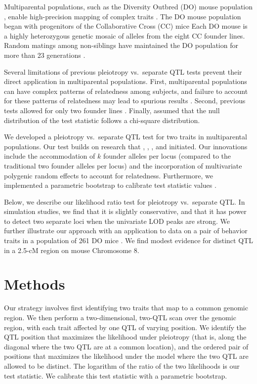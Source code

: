 \documentclass[oneside]{book}\usepackage[]{graphicx}\usepackage[]{color}
\begin{document}
Multiparental populations, such
as the Diversity Outbred (DO) mouse population \citep{churchill2012diversity}, enable high-precision
mapping of complex traits \citep{de2014genetics}. The DO
mouse population began with progenitors of the Collaborative
Cross (CC) mice \citep{churchill2004collaborative}
Each DO mouse is a highly heterozygous genetic mosaic
of alleles from the eight CC founder lines. Random
matings among non-siblings have maintained the DO
population for more than 23 generations \citep{chesler2016diversity}.

Several limitations of previous pleiotropy vs.\ separate QTL tests
prevent their direct application in multiparental populations. First,
multiparental populations can have complex patterns of relatedness
among subjects, and failure to account for these patterns of
relatedness may lead to spurious results \citep{yang2014advantages}.
Second, previous tests allowed for only two founder lines
\citep{jiang1995multiple}. Finally, \citet{jiang1995multiple} assumed
that the null distribution of the test statistic follows a chi-square
distribution.

We developed a pleiotropy vs.\ separate QTL test for two traits in
multiparental populations. Our test builds on research that
\citet{jiang1995multiple}, \citet{knott2000multitrait},
\citet{tian2016dissection}, and \citet{zhou2014efficient} initiated.
Our innovations include the accommodation of $k$ founder alleles per
locus (compared to the traditional two founder alleles per locus) and
the incorporation of multivariate polygenic random effects to account
for relatedness. Furthermore, we implemented a parametric bootstrap to
calibrate test statistic values \citep{efron1979,tian2016dissection}.

Below, we describe our likelihood ratio test for pleiotropy vs.\
separate QTL. In simulation studies, we find that it is slightly
conservative, and that it has power to detect two separate loci when
the univariate LOD peaks are strong. We further illustrate our
approach with an application to data on a pair of behavior traits in
a population of 261 DO mice \citep{logan2013high,recla2014precise}.
We find modest evidence for distinct QTL in a 2.5-cM region on mouse
Chromosome 8.


\section{Methods}
\label{sec:materials:methods}

Our strategy involves first identifying two traits that map to a common
genomic region. We then perform a two-dimensional, two-QTL scan over
the genomic region, with each trait affected by one QTL of varying
position. We identify the QTL position that maximizes the likelihood
under pleiotropy (that is, along the diagonal where the two QTL are at
a common location), and the ordered pair of positions that maximizes
the likelihood under the model where the two QTL are allowed to be
distinct. The logarithm of the ratio of the two likelihoods is our
test statistic. We calibrate this test statistic with a parametric
bootstrap.
\end{document}
